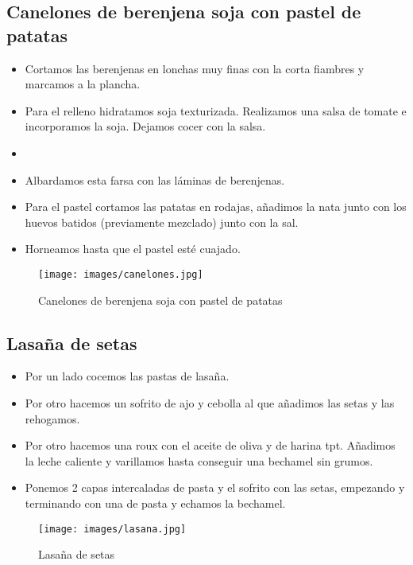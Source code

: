 \subsection{Canelones de berenjena soja con pastel de patatas}
\label{sec:canelones}
\begin{itemize}
\item Cortamos las berenjenas en lonchas muy finas con la corta fiambres y marcamos a la plancha.
\item Para el relleno hidratamos soja texturizada. Realizamos una salsa de tomate e incorporamos la soja. Dejamos cocer con la salsa. \item \item Albardamos esta farsa con las láminas de berenjenas.
\item Para el pastel cortamos las patatas en rodajas, añadimos la nata junto con los huevos batidos (previamente mezclado) junto con la sal. 
\item Horneamos hasta que el pastel esté cuajado.
\end{itemize}

\begin{figure}[h]
  \begin{center}
    \texttt{[image: images/canelones.jpg]}
    \caption{Canelones de berenjena soja con pastel de patatas}
    \label{fig:canelones}
  \end{center}
\end{figure}

\subsection{Lasaña de setas}
\label{sec:lasana}
\begin{itemize}
\item Por un lado cocemos las pastas de lasaña.
\item Por otro hacemos un sofrito de ajo y cebolla al que añadimos las setas y las rehogamos. 
\item Por otro hacemos una roux con el aceite de oliva y de harina tpt. Añadimos la leche caliente y varillamos hasta conseguir una bechamel sin grumos.
\item Ponemos 2 capas intercaladas de pasta y el sofrito con las setas, empezando y terminando con una de pasta y echamos la bechamel.
\end{itemize}

\begin{figure}[h]
  \begin{center}
    \texttt{[image: images/lasana.jpg]}
    \caption{Lasaña de setas}
    \label{fig:lasana}
  \end{center}
\end{figure}

